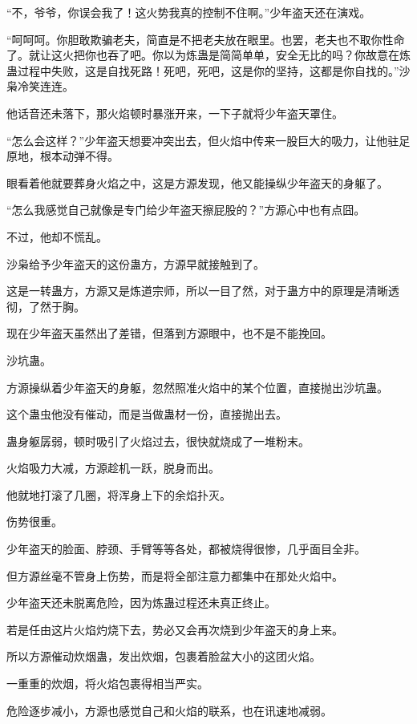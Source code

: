 
\begin{this_body}

“不，爷爷，你误会我了！这火势我真的控制不住啊。”少年盗天还在演戏。

“呵呵呵。你胆敢欺骗老夫，简直是不把老夫放在眼里。也罢，老夫也不取你性命了。就让这火把你也吞了吧。你以为炼蛊是简简单单，安全无比的吗？你故意在炼蛊过程中失败，这是自找死路！死吧，死吧，这是你的坚持，这都是你自找的。”沙枭冷笑连连。

他话音还未落下，那火焰顿时暴涨开来，一下子就将少年盗天罩住。

“怎么会这样？”少年盗天想要冲突出去，但火焰中传来一股巨大的吸力，让他驻足原地，根本动弹不得。

眼看着他就要葬身火焰之中，这是方源发现，他又能操纵少年盗天的身躯了。

“怎么我感觉自己就像是专门给少年盗天擦屁股的？”方源心中也有点囧。

不过，他却不慌乱。

沙枭给予少年盗天的这份蛊方，方源早就接触到了。

这是一转蛊方，方源又是炼道宗师，所以一目了然，对于蛊方中的原理是清晰透彻，了然于胸。

现在少年盗天虽然出了差错，但落到方源眼中，也不是不能挽回。

沙坑蛊。

方源操纵着少年盗天的身躯，忽然照准火焰中的某个位置，直接抛出沙坑蛊。

这个蛊虫他没有催动，而是当做蛊材一份，直接抛出去。

蛊身躯孱弱，顿时吸引了火焰过去，很快就烧成了一堆粉末。

火焰吸力大减，方源趁机一跃，脱身而出。

他就地打滚了几圈，将浑身上下的余焰扑灭。

伤势很重。

少年盗天的脸面、脖颈、手臂等等各处，都被烧得很惨，几乎面目全非。

但方源丝毫不管身上伤势，而是将全部注意力都集中在那处火焰中。

少年盗天还未脱离危险，因为炼蛊过程还未真正终止。

若是任由这片火焰灼烧下去，势必又会再次烧到少年盗天的身上来。

所以方源催动炊烟蛊，发出炊烟，包裹着脸盆大小的这团火焰。

一重重的炊烟，将火焰包裹得相当严实。

危险逐步减小，方源也感觉自己和火焰的联系，也在讯速地减弱。


\end{this_body}
